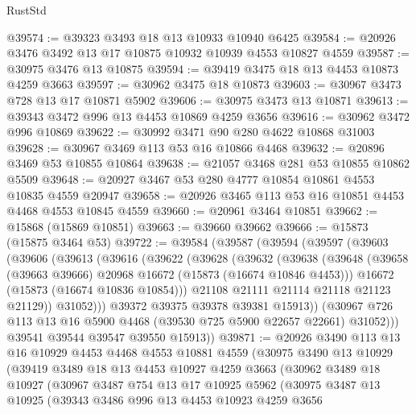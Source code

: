 \begin{lexlean}{RustStd}
\begin{coremodule}
@39574 := @39323 @3493 @18 @13 @10933 @10940 @6425
@39584 := @20926 @3476 @3492 @13 @17 @10875 @10932 @10939 @4553 @10827 @4559
@39587 := @30975 @3476 @13 @10875
@39594 := @39419 @3475 @18 @13 @4453 @10873 @4259 @3663
@39597 := @30962 @3475 @18 @10873
@39603 := @30967 @3473 @728 @13 @17 @10871 @5902
@39606 := @30975 @3473 @13 @10871
@39613 := @39343 @3472 @996 @13 @4453 @10869 @4259 @3656
@39616 := @30962 @3472 @996 @10869
@39622 := @30992 @3471 @90 @280 @4622 @10868 @31003
@39628 := @30967 @3469 @113 @53 @16 @10866 @4468
@39632 := @20896 @3469 @53 @10855 @10864
@39638 := @21057 @3468 @281 @53 @10855 @10862 @5509
@39648 := @20927 @3467 @53 @280 @4777 @10854 @10861 @4553 @10835 @4559 @20947
@39658 := @20926 @3465 @113 @53 @16 @10851 @4453 @4468 @4553 @10845 @4559
@39660 := @20961 @3464 @10851
@39662 := @15868 (@15869 @10851)
@39663 := @39660 @39662
@39666 := @15873 (@15875 @3464 @53)
@39722 := @39584
    (@39587
      (@39594
        (@39597
          (@39603
            (@39606
              (@39613
                (@39616
                  (@39622
                    (@39628
                      (@39632
                        (@39638
                          (@39648
                            (@39658 (@39663 @39666) @20968 @16672 (@15873 (@16674 @10846 @4453)))
                            @16672
                            (@15873 (@16674 @10836 @10854)))
                          @21108
                          @21111
                          @21114
                          @21118
                          @21123
                          @21129))
                      @31052)))
                @39372
                @39375
                @39378
                @39381
                @15913))
            (@30967 @726 @113 @13 @16 @5900 @4468 (@39530 @725 @5900 @22657 @22661) @31052)))
        @39541
        @39544
        @39547
        @39550
        @15913))
@39871 := @20926
    @3490
    @113
    @13
    @16
    @10929
    @4453
    @4468
    @4553
    @10881
    @4559
    (@30975
      @3490
      @13
      @10929
      (@39419
        @3489
        @18
        @13
        @4453
        @10927
        @4259
        @3663
        (@30962
          @3489
          @18
          @10927
          (@30967
            @3487
            @754
            @13
            @17
            @10925
            @5962
            (@30975
              @3487
              @13
              @10925
              (@39343
                @3486
                @996
                @13
                @4453
                @10923
                @4259
                @3656

\end{coremodule}
\end{lexlean}
